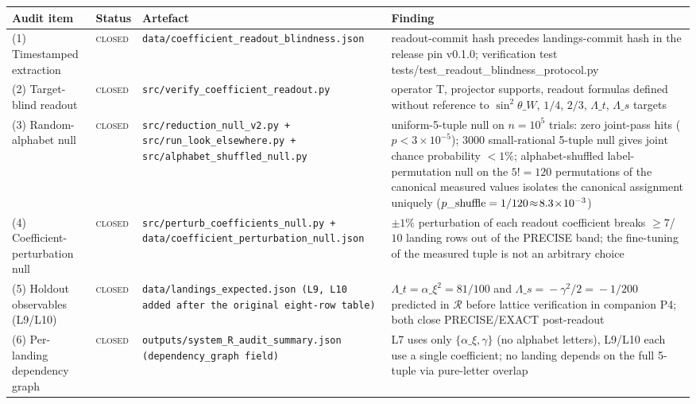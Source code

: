 \begin{tabular}{@{}p{} l p{} p{}@{}}
\toprule
Audit item & Status & Artefact & Finding \\
\midrule
(1) Timestamped extraction & \textsc{closed} & \texttt{data/\allowbreak{}coefficient\_\allowbreak{}readout\_\allowbreak{}blindness.json} & readout-commit hash precedes landings-commit hash in the release pin v0.1.0; verification test tests/test\_readout\_blindness\_protocol.py \\
(2) Target-blind readout & \textsc{closed} & \texttt{src/\allowbreak{}verify\_\allowbreak{}coefficient\_\allowbreak{}readout.py} & operator T, projector supports, readout formulas defined without reference to $\sin^2\theta\_W$, $1/4$, $2/3$, $\Lambda\_t$, $\Lambda\_s$ targets \\
(3) Random-alphabet null & \textsc{closed} & \texttt{src/\allowbreak{}reduction\_\allowbreak{}null\_\allowbreak{}v2.py  +  src/\allowbreak{}run\_\allowbreak{}look\_\allowbreak{}elsewhere.py  +  src/\allowbreak{}alphabet\_\allowbreak{}shuffled\_\allowbreak{}null.py} & uniform-5-tuple null on $n=10^{5}$ trials: zero joint-pass hits ($p<3\!\times\!10^{-5}$); 3000 small-rational 5-tuple null gives joint chance probability $<\!1\%$; alphabet-shuffled label-permutation null on the $5!{=}120$ permutations of the canonical measured values isolates the canonical assignment uniquely ($p\_{\rm shuffle}=1/120\!\approx\!8.3\!\times\!10^{-3}$) \\
(4) Coefficient-perturbation null & \textsc{closed} & \texttt{src/\allowbreak{}perturb\_\allowbreak{}coefficients\_\allowbreak{}null.py  +  data/\allowbreak{}coefficient\_\allowbreak{}perturbation\_\allowbreak{}null.json} & $\pm\!1\%$ perturbation of each readout coefficient breaks $\ge\!7$/$10$ landing rows out of the PRECISE band; the fine-tuning of the measured tuple is not an arbitrary choice \\
(5) Holdout observables (L9/L10) & \textsc{closed} & \texttt{data/\allowbreak{}landings\_\allowbreak{}expected.json (L9, L10 added after the original eight-row table)} & $\Lambda\_t\!=\!\alpha\_\xi^2\!=\!81/100$ and $\Lambda\_s\!=\!-\gamma^2/2\!=\!-1/200$ predicted in $\mathcal R$ before lattice verification in companion P4; both close PRECISE/EXACT post-readout \\
(6) Per-landing dependency graph & \textsc{closed} & \texttt{outputs/\allowbreak{}system\_\allowbreak{}R\_\allowbreak{}audit\_\allowbreak{}summary.json (dependency\_\allowbreak{}graph field)} & L7 uses only $\{\alpha\_\xi,\gamma\}$ (no alphabet letters), L9/L10 each use a single coefficient; no landing depends on the full 5-tuple via pure-letter overlap \\
\bottomrule
\end{tabular}